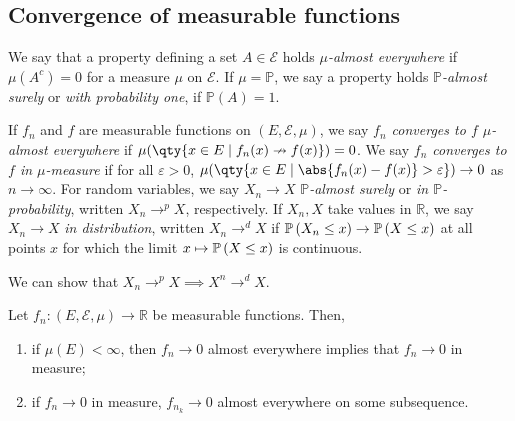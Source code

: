 \subsection{Convergence of measurable functions}
\begin{definition}
	We say that a property defining a set $A \in \mathcal E$ holds \emph{$\mu$-almost everywhere} if $\mu(A^c) = 0$ for a measure $\mu$ on $\mathcal E$.
	If $\mu = \mathbb P$, we say a property holds \emph{$\mathbb P$-almost surely} or \emph{with probability one}, if $\mathbb P(A) = 1$.
\end{definition}
\begin{definition}
	If $f_n$ and $f$ are measurable functions on $(E,\mathcal E,\mu)$, we say \emph{$f_n$ converges to $f$ $\mu$-almost everywhere} if $\mu(\qty{x \in E \mid f_n(x) \nrightarrow f(x)}) = 0$.
	We say \emph{$f_n$ converges to $f$ in $\mu$-measure} if for all $\varepsilon > 0$, $\mu(\qty{x\in E \mid \abs{f_n(x) - f(x)} > \varepsilon}) \to 0$ as $n \to \infty$.
	For random variables, we say $X_n \to X$ \emph{$\mathbb P$-almost surely} or \emph{in $\mathbb P$-probability}, written $X_n \to^p X$, respectively.
	If $X_n, X$ take values in $\mathbb R$, we say $X_n \to X$ \emph{in distribution}, written $X_n \to^d X$ if $\mathbb{P}\left({X_n \leq x}\right) \to \mathbb{P}\left({X \leq x}\right)$ at all points $x$ for which the limit $x \mapsto \mathbb{P}\left({X \leq x}\right)$ is continuous.
\end{definition}
We can show that $X_n \to^p X \implies X^n \to^d X$.
\begin{theorem}
	Let $f_n \colon (E,\mathcal E,\mu) \to \mathbb R$ be measurable functions.
	Then,
	\begin{enumerate}
		\item if $\mu(E) < \infty$, then $f_n \to 0$ almost everywhere implies that $f_n \to 0$ in measure;
		\item if $f_n \to 0$ in measure, $f_{n_k} \to 0$ almost everywhere on some subsequence.
	\end{enumerate}
\end{theorem}
